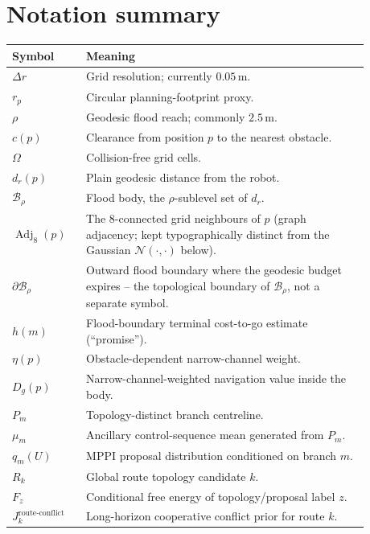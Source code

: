 \documentclass[11pt,a4paper]{article}
\newcommand{\Free}{\Omega}
\newcommand{\B}{\mathcal{B}}
\newcommand{\N}{\mathcal{N}}
\newcommand{\Adj}{\operatorname{Adj}}
\begin{document}
\section{Notation summary}
\label{sec:notation}

\begin{table}[h]
\centering
\begin{tabular}{>{\bfseries}p{0.18\linewidth}p{0.70\linewidth}}
\toprule
Symbol & Meaning \\
\midrule
$\Delta r$ & Grid resolution; currently $0.05\,\mathrm{m}$. \\
$r_p$ & Circular planning-footprint proxy. \\
$\rho$ & Geodesic flood reach; commonly $2.5\,\mathrm{m}$. \\
$c(p)$ & Clearance from position $p$ to the nearest obstacle. \\
$\Free$ & Collision-free grid cells. \\
$d_r(p)$ & Plain geodesic distance from the robot. \\
$\B_\rho$ & Flood body, the $\rho$-sublevel set of $d_r$. \\
$\Adj_8(p)$ & The 8-connected grid neighbours of $p$ (graph adjacency; kept
typographically distinct from the Gaussian $\N(\cdot,\cdot)$ below). \\
$\partial\B_\rho$ & Outward flood boundary where the geodesic budget expires
-- the topological boundary of $\B_\rho$, not a separate symbol. \\
$h(m)$ & Flood-boundary terminal cost-to-go estimate (``promise''). \\
$\eta(p)$ & Obstacle-dependent narrow-channel weight. \\
$D_g(p)$ & Narrow-channel-weighted navigation value inside the body. \\
$P_m$ & Topology-distinct branch centreline. \\
$\mu_m$ & Ancillary control-sequence mean generated from $P_m$. \\
$q_m(U)$ & MPPI proposal distribution conditioned on branch $m$. \\
$R_k$ & Global route topology candidate $k$. \\
$F_z$ & Conditional free energy of topology/proposal label $z$. \\
$J_k^{\mathrm{route\mbox{-}conflict}}$ & Long-horizon cooperative conflict prior for route $k$. \\
\bottomrule
\end{tabular}
\end{table}
\end{document}
